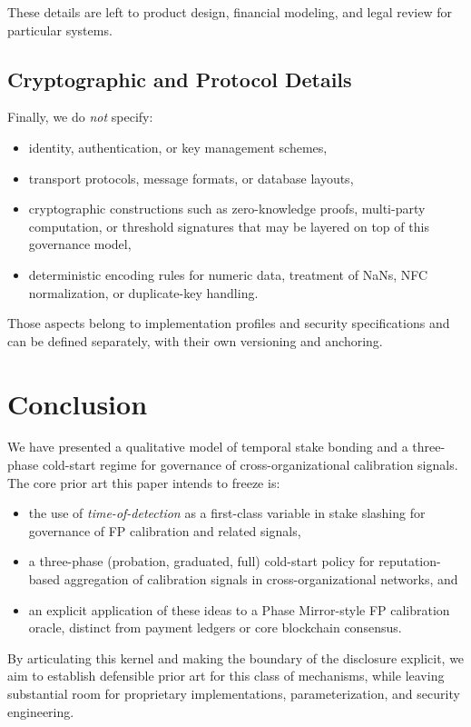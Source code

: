 \documentclass[11pt]{article}
\begin{document}
These details are left to product design, financial modeling, and legal review for particular systems.

\subsection{Cryptographic and Protocol Details}

Finally, we do \emph{not} specify:
\begin{itemize}[leftmargin=*]
  \item identity, authentication, or key management schemes,
  \item transport protocols, message formats, or database layouts,
  \item cryptographic constructions such as zero-knowledge proofs, multi-party computation, or threshold signatures that may be layered on top of this governance model,
  \item deterministic encoding rules for numeric data, treatment of NaNs, NFC normalization, or duplicate-key handling.
\end{itemize}

Those aspects belong to implementation profiles and security specifications and can be defined separately, with their own versioning and anchoring.

\section{Conclusion}

We have presented a qualitative model of temporal stake bonding and a three-phase cold-start regime for governance of cross-organizational calibration signals.
The core prior art this paper intends to freeze is:
\begin{itemize}[leftmargin=*]
  \item the use of \emph{time-of-detection} as a first-class variable in stake slashing for governance of FP calibration and related signals,
  \item a three-phase (probation, graduated, full) cold-start policy for reputation-based aggregation of calibration signals in cross-organizational networks, and
  \item an explicit application of these ideas to a Phase Mirror-style FP calibration oracle, distinct from payment ledgers or core blockchain consensus.
\end{itemize}

By articulating this kernel and making the boundary of the disclosure explicit, we aim to establish defensible prior art for this class of mechanisms, while leaving substantial room for proprietary implementations, parameterization, and security engineering.
\end{document}
